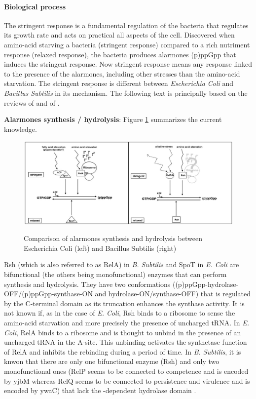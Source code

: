 \paragraph{Biological process} The stringent response is a fundamental regulation of the bacteria that regulates its growth rate and acts on practical all aspects of the cell. Discovered when amino-acid starving a bacteria (stringent response) compared to a rich nutriment response (relaxed response), the bacteria produces alarmones (p)ppGpp that induces the stringent response. Now stringent response means any response linked to the presence of the alarmones, including other stresses than the amino-acid starvation. The stringent response is different between {\it Escherichia Coli} and {\it Bacillus Subtilis} in its mechanism. The following text is principally based on the reviews of \citet{kriel_direct_2012} and of \citet{wolz_synthesis_2010}.

\medskip

{\bf Alarmones synthesis / hydrolysis}: Figure \ref{tab:compareColiSubAlarmoneProd} summarizes the current knowledge.
\begin{figure}[hbtp]
  \centering
  \includegraphics[width=15cm]{figure/alarmoneProd.png}\\
  \caption{Comparison of alarmones synthesis and hydrolysis between Escherichia Coli (left) and Bacillus Subtilis (right) \citep{wolz_synthesis_2010}}\label{tab:compareColiSubAlarmoneProd}
\end{figure}
Rsh (which is also referred to as RelA) in {\it B. Subtilis} and SpoT in {\it E. Coli} are bifunctional (the others being monofunctional) enzymes that can perform synthesis and hydrolysis. They have two conformations ((p)ppGpp-hydrolase-OFF/(p)ppGpp-synthase-ON and hydrolase-ON/synthase-OFF) that is regulated by the C-terminal domain as its truncation enhances the synthase activity. It is not known if, as in the case of {\it E. Coli}, Rsh binds to a ribosome to sense the amino-acid starvation and more precisely the presence of uncharged tRNA. In {\it E. Coli}, RelA binds to a ribosome and is thought to unbind in the presence of an uncharged tRNA in the A-site. This unbinding activates the synthetase function of RelA and inhibits the rebinding during a period of time. In {\it B. Subtilis}, it is knwon that there are only one bifunctional enzyme (Rsh) and only two monofunctional ones (RelP seems to be connected to competence and is encoded by yjbM whereas RelQ seems to be connected to persistence and virulence and is encoded by ywaC) that lack the -dependent hydrolase domain \citep{GaL:15}.

